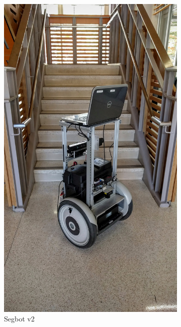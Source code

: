 \documentclass[
  oneside,
  11pt, a4paper,
  footinclude=true,
  headinclude=true,
  cleardoublepage=empty
]{article}
\begin{document}
\begin{figure}[!tbp]
  \begin{subfigure}[b]{0.3\textwidth}
    \includegraphics[width=\textwidth]{bwi_segbot2}
    \caption{Segbot v2}
    \label{fig:segbotv2}
  \end{subfigure}
  \hfill
  \begin{subfigure}[b]{0.3\textwidth}

\end{subfigure}
\end{figure}
\end{document}
